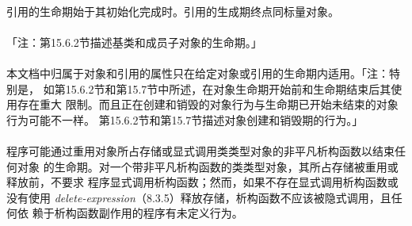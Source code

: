\paragraph{}
引用的生命期始于其初始化完成时。引用的生成期终点同标量对象。

\paragraph{}
「注：第15.6.2节描述基类和成员子对象的生命期。」

\paragraph{}
本文档中归属于对象和引用的属性只在给定对象或引用的生命期内适用。「注：特别是，
如第15.6.2节和第15.7节中所述，在对象生命期开始前和生命期结束后其使用存在重大
限制。而且正在创建和销毁的对象行为与生命期已开始未结束的对象行为可能不一样。
第15.6.2节和第15.7节描述对象创建和销毁期的行为。」

\paragraph{}
程序可能通过重用对象所占存储或显式调用类类型对象的非平凡析构函数以结束任何对象
的生命期。对一个带非平凡析构函数的类类型对象，其所占存储被重用或释放前，不要求
程序显式调用析构函数；然而，如果不存在显式调用析构函数或没有使用
\textit{delete-expression}（8.3.5）释放存储，析构函数不应该被隐式调用，且任何依
赖于析构函数副作用的程序有未定义行为。

